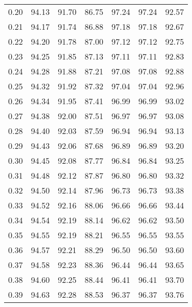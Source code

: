 \begin{tabular}{|c|c|c|c|c|c|c|}
      0.20 &     94.13 &     91.70 &      86.75 &   97.24 &      97.24 &         92.57 \\
      0.21 &     94.17 &     91.74 &      86.88 &   97.18 &      97.18 &         92.67 \\
      0.22 &     94.20 &     91.78 &      87.00 &   97.12 &      97.12 &         92.75 \\
      0.23 &     94.25 &     91.85 &      87.13 &   97.11 &      97.11 &         92.83 \\
      0.24 &     94.28 &     91.88 &      87.21 &   97.08 &      97.08 &         92.88 \\
      0.25 &     94.32 &     91.92 &      87.32 &   97.04 &      97.04 &         92.96 \\
      0.26 &     94.34 &     91.95 &      87.41 &   96.99 &      96.99 &         93.02 \\
      0.27 &     94.38 &     92.00 &      87.51 &   96.97 &      96.97 &         93.08 \\
      0.28 &     94.40 &     92.03 &      87.59 &   96.94 &      96.94 &         93.13 \\
      0.29 &     94.43 &     92.06 &      87.68 &   96.89 &      96.89 &         93.20 \\
      0.30 &     94.45 &     92.08 &      87.77 &   96.84 &      96.84 &         93.25 \\
      0.31 &     94.48 &     92.12 &      87.87 &   96.80 &      96.80 &         93.32 \\
      0.32 &     94.50 &     92.14 &      87.96 &   96.73 &      96.73 &         93.38 \\
      0.33 &     94.52 &     92.16 &      88.06 &   96.66 &      96.66 &         93.44 \\
      0.34 &     94.54 &     92.19 &      88.14 &   96.62 &      96.62 &         93.50 \\
      0.35 &     94.55 &     92.19 &      88.21 &   96.55 &      96.55 &         93.55 \\
      0.36 &     94.57 &     92.21 &      88.29 &   96.50 &      96.50 &         93.60 \\
      0.37 &     94.58 &     92.23 &      88.36 &   96.44 &      96.44 &         93.65 \\
      0.38 &     94.60 &     92.25 &      88.44 &   96.41 &      96.41 &         93.70 \\
      0.39 &     94.63 &     92.28 &      88.53 &   96.37 &      96.37 &         93.76 \\

\end{tabular}
